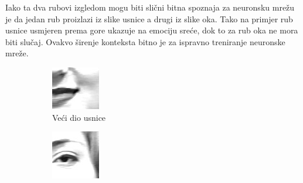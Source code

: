 \documentclass[times, utf8, zavrsni,numeric,pstricks]{fer}
\begin{document}
Iako ta dva rubovi izgledom mogu biti slični bitna spoznaja za neuronsku mrežu je da jedan rub proizlazi iz slike usnice a drugi iz slike oka. Tako na primjer rub usnice usmjeren prema gore ukazuje na emociju sreće, dok to za rub oka ne mora biti slučaj. Ovakvo širenje konteksta bitno je za ispravno treniranje neuronske mreže.




\begin{figure}[H]
	\begin{subfigure}[b]{0.5\linewidth}
	  	\centering
		\includegraphics[width=\linewidth, height=0.3\paperheight, keepaspectratio]{usna.png}
		\caption{Veći dio usnice}		
	\end{subfigure}
	\begin{subfigure}[b]{0.5\linewidth}
	  	\centering
		\includegraphics[width=\linewidth, height=0.3\paperheight, keepaspectratio]{oko.png}

\end{subfigure}
\end{figure}
\end{document}
